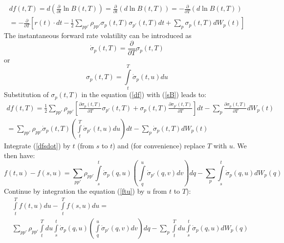 \documentclass[10pt]{article}
\begin{document}
\begin{multline}
\label{df}
 df(t,T) = d \left ( \frac{\partial}{\partial t}   \ln B(t,T)    \right )= \frac{\partial}{\partial t} \left ( d \ln B(t,T)\right )= - \frac{\partial}{\partial T} \left ( d \ln B(t,T)\right ) \\
 = -\frac{\partial}{\partial T} \left [  r(t) \cdot dt - \frac{1}{2} \sum \limits_{pp'} \rho_{pp'} \sigma_p(t,T) \sigma_{p'} (t,T) dt  + \sum \limits_{p} \sigma_p (t,T)dW_p(t) \right ]
\end{multline}
The instantaneous forward rate volatility can be introduced as
\begin{equation}
\label{sdot}
\dot {\sigma}_p(t,T) = \frac{\partial}{\partial T}   \sigma_p (t,T)
\end{equation}
or
\begin{equation}
\label{sB}
\sigma_p (t,T) = \int \limits_t^T \dot {\sigma}_p(t,u) du   
\end{equation}
Substitution of $\sigma_p (t,T)$ in the equation (\ref{df}) with (\ref{sB})  leads to:
\begin{multline}
\label{dfsdot}
 df(t,T) = \frac{1}{2}\sum \limits_{pp'} \rho_{pp'} \left [ \frac{\partial {\sigma_p(t,T)}}{\partial T} \sigma_{p'}(t,T)+  \sigma_{p}(t,T)  \frac{\partial {\sigma_{p'}(t,T)}}{\partial T}  \right ]dt-\sum \limits_p \frac{\partial {\sigma_p(t,T)}}{\partial T} dW_p (t) \\
 = \sum \limits_{pp'} \rho_{pp'} \dot {\sigma}_p(t,T) \left ( \int \limits_t^T \dot {\sigma}_{p'}(t,u)du \right )dt-\sum \limits_p \dot {\sigma}_p(t,T)dW_p(t)
\end{multline}
Integrate (\ref{dfsdot}) by $t$ (from $s$ to $t$) and (for convenience) replace $T$ with $u$. We then have:
\begin{equation}
\label{ftu}
f(t,u) - f(s,u) =  \sum \limits_{pp'} \rho_{pp'} \int \limits_s^t \dot {\sigma}_p(q,u) \left(\int \limits_q^u \dot {\sigma}_{p'}(q,v)dv \right)dq - \sum \limits_p \int \limits_s^t \dot {\sigma}_p(q,u)dW_p(q)
\end{equation}
Continue by integration the equation (\ref{ftu}) by $u$ from $t$ to $T$):
\begin{align}
\nonumber & \int \limits_t^T f(t,u)du -  \int \limits_t^T f(s,u)du =  \\ 
\label{intf_1}
& \sum \limits_{pp'} \rho_{pp'}  \int \limits_t^T du \int \limits_s^t \dot {\sigma}_p(q,u) \left(\int \limits_q^u \dot {\sigma}_{p'}(q,v)dv \right)dq - \sum \limits_p \int \limits_t^T du \int \limits_s^t \dot {\sigma}_p(q,u)dW_p(q)
\end{align}
\end{document}
